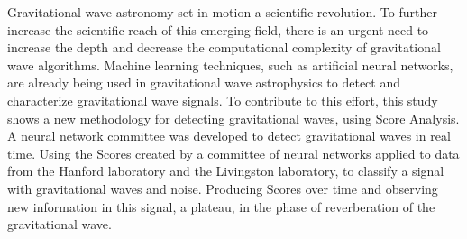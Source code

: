 Gravitational wave astronomy set in motion a scientific revolution. To further increase the scientific reach of this emerging field, there is an urgent need to increase the depth and decrease the computational complexity of gravitational wave algorithms. Machine learning techniques, such as artificial neural networks, are already being used in gravitational wave astrophysics to detect and characterize gravitational wave signals. To contribute to this effort, this study shows a new methodology for detecting gravitational waves, using Score Analysis. A neural network committee was developed to detect gravitational waves in real time. Using the Scores created by a committee of neural networks applied to data from the Hanford laboratory and the Livingston laboratory, to classify a signal with gravitational waves and noise. Producing Scores over time and observing new information in this signal, a plateau, in the phase of reverberation of the gravitational wave.



